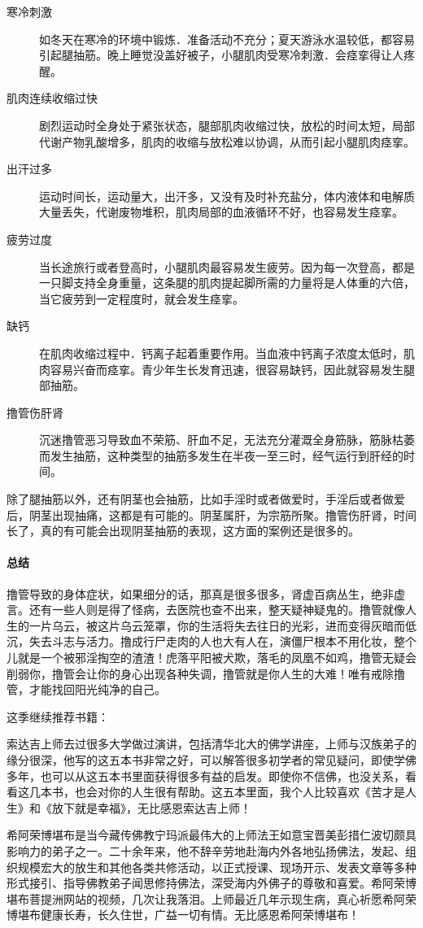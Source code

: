 \begin{description}
    \item[寒冷刺激] 如冬天在寒冷的环境中锻炼．准备活动不充分；夏天游泳水温较低，都容易引起腿抽筋。晚上睡觉没盖好被子，小腿肌肉受寒冷刺激．会痉挛得让人疼醒。
    \item[肌肉连续收缩过快] 剧烈运动时全身处于紧张状态，腿部肌肉收缩过快，放松的时间太短，局部代谢产物乳酸增多，肌肉的收缩与放松难以协调，从而引起小腿肌肉痉挛。
    \item[出汗过多] 运动时间长，运动量大，出汗多，又没有及时补充盐分，体内液体和电解质大量丢失，代谢废物堆积，肌肉局部的血液循环不好，也容易发生痉挛。
    \item[疲劳过度] 当长途旅行或者登高时，小腿肌肉最容易发生疲劳。因为每一次登高，都是一只脚支持全身重量，这条腿的肌肉提起脚所需的力量将是人体重的六倍，当它疲劳到一定程度时，就会发生痉挛。
    \item[缺钙] 在肌肉收缩过程中．钙离子起着重要作用。当血液中钙离子浓度太低时，肌肉容易兴奋而痉挛。青少年生长发育迅速，很容易缺钙，因此就容易发生腿部抽筋。
    \item[撸管伤肝肾] 沉迷撸管恶习导致血不荣筋、肝血不足，无法充分灌溉全身筋脉，筋脉枯萎而发生抽筋，这种类型的抽筋多发生在半夜一至三时，经气运行到肝经的时间。
\end{description}

除了腿抽筋以外，还有阴茎也会抽筋，比如手淫时或者做爱时，手淫后或者做爱后，阴茎出现抽痛，这都是有可能的。阴茎属肝，为宗筋所聚。撸管伤肝肾，时间长了，真的有可能会出现阴茎抽筋的表现，这方面的案例还是很多的。

\paragraph*{总结}

撸管导致的身体症状，如果细分的话，那真是很多很多，肾虚百病丛生，绝非虚言。还有一些人则是得了怪病，去医院也查不出来，整天疑神疑鬼的。撸管就像人生的一片乌云，被这片乌云笼罩，你的生活将失去往日的光彩，进而变得灰暗而低沉，失去斗志与活力。撸成行尸走肉的人也大有人在，演僵尸根本不用化妆，整个儿就是一个被邪淫掏空的渣渣！虎落平阳被犬欺，落毛的凤凰不如鸡，撸管无疑会削弱你，撸管会让你的身心出现各种失调，撸管就是你人生的大难！唯有戒除撸管，才能找回阳光纯净的自己。

这季继续推荐书籍：

\begin{book}
    索达吉上师去过很多大学做过演讲，包括清华北大的佛学讲座，上师与汉族弟子的缘分很深，他写的这五本书非常之好，可以解答很多初学者的常见疑问，即使学佛多年，也可以从这五本书里面获得很多有益的启发。即使你不信佛，也没关系，看看这几本书，也会对你的人生很有帮助。这五本里面，我个人比较喜欢《苦才是人生》和《放下就是幸福》，无比感恩索达吉上师！
\end{book}

\begin{book}
    希阿荣博堪布是当今藏传佛教宁玛派最伟大的上师法王如意宝晋美彭措仁波切颇具影响力的弟子之一。二十余年来，他不辞辛劳地赴海内外各地弘扬佛法，发起、组织规模宏大的放生和其他各类共修活动，以正式授课、现场开示、发表文章等多种形式接引、指导佛教弟子闻思修持佛法，深受海内外佛子的尊敬和喜爱。希阿荣博堪布菩提洲网站的视频，几次让我落泪。上师最近几年示现生病，真心祈愿希阿荣博堪布健康长寿，长久住世，广益一切有情。无比感恩希阿荣博堪布！
\end{book}
